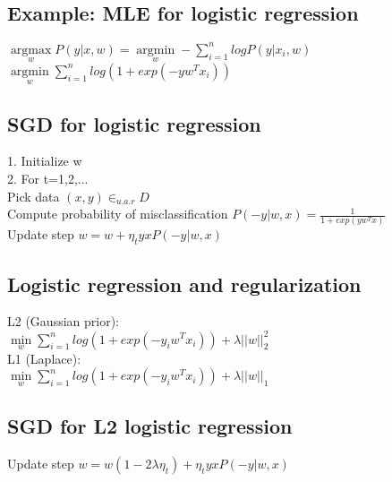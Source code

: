 \subsection*{Example: MLE for logistic regression}
$\underset{w}{\operatorname{argmax}} P(y|x,w) = \underset{w}{\operatorname{argmin}} - \sum_{i=1}^n log P(y|x_i,w)$\\
$\underset{w}{\operatorname{argmin}} \sum_{i=1}^n log(1+exp(-yw^Tx_i))$


\subsection*{SGD for logistic regression}
1. Initialize w\\
2. For t=1,2,...\\
Pick data $(x,y) \in_{u.a.r} D$\\
Compute probability of misclassification $P(-y|w,x) = \frac{1}{1+exp(yw^Tx)}$\\
Update step $w = w + \eta_t y x P(-y|w,x)$

\subsection*{Logistic regression and regularization}
L2 (Gaussian prior):\\
$\underset{w}{\operatorname{min}} \sum_{i=1}^n log(1+exp(-y_i w^T x_i)) + \lambda ||w||_2^2$\\
L1 (Laplace):\\
$\underset{w}{\operatorname{min}} \sum_{i=1}^n log(1+exp(-y_i w^T x_i)) + \lambda ||w||_1$\\

\subsection*{SGD for L2 logistic regression}
Update step $w = w(1-2\lambda \eta_t) + \eta_t y x P(-y|w,x)$